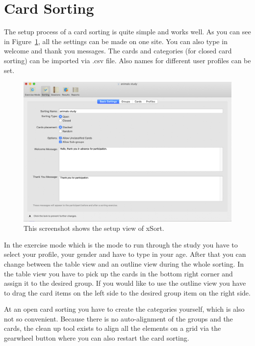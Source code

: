 \section{Card Sorting}

The setup process of a card sorting is quite simple and works well. As 
you can see in Figure~\ref{fig:xSort-setup}, all the settings can be 
made on one site. You can also type in welcome and thank you 
messages. The cards and categories (for closed card sorting) can be 
imported via .csv file. Also names for different user profiles can be 
set.



\begin{figure}[tp] 
\centering
\includegraphics[keepaspectratio,width=460px]{images/xsort-setup.png}
\caption[xSort Setup] { This screenshot shows the setup view of xSort.
 }
\label{fig:xSort-setup}
\end{figure}



In the exercise mode which is the mode to run through the study 
you have to select your profile, your gender and have to type 
in your age. After that you can change between the table view 
and an outline view during the whole sorting. In the table view 
you have to pick up the cards in the bottom right corner and 
assign it to the desired group. If you would like to use the 
outline view you have to drag the card items on the left side 
to the desired group item on the right side. 

At an open card sorting you have to create the categories yourself, 
which is also not so convenient. Because there is no 
auto-alignment of the groups and the cards, the clean up 
tool exists to align all the elements on a grid via the gearwheel 
button where you can also restart the card sorting. 

